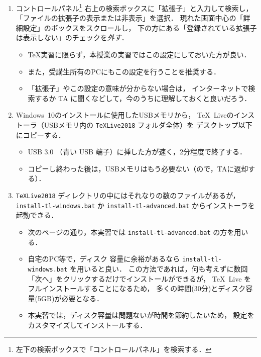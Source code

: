\documentclass{ltjsarticle}
\begin{document}
\begin{enumerate}
  \itemsep\medskipamount
  \setcounter{enumi}{-1}
\item コントロールパネル\footnote{左下の検索ボックスで「コントロールパネル」を検索する．}
  右上の検索ボックスに「拡張子」と入力して検索し，
  「ファイルの拡張子の表示または非表示」を選択．
  現れた画面中心の「詳細設定」のボックスをスクロールし，
  下の方にある「登録されている拡張子は表示しない」のチェックを\emph{外す}．
  \begin{itemize}
  \item \TeX 実習に限らず，本授業の実習ではこの設定にしておいた方が良い．
  \item また，受講生所有のPCにもこの設定を行うことを推奨する．
  \item 「拡張子」やこの設定の意味が分からない場合は，
    インターネットで検索するか TA に聞くなどして，今のうちに理解しておくと良いだろう．
  \end{itemize}
\item Windows~10のインストールに使用したUSBメモリから，
  \TeX~Liveのインストーラ（USBメモリ内の \texttt{TeXLive2018} フォルダ全体）を
  デスクトップ以下にコピーする．
  \begin{itemize}
  \item USB 3.0 （青い USB 端子）に挿した方が速く，2分程度で終了する．
  \item コピーし終わった後は，USBメモリはもう必要ない（ので，TAに返却する）．
  \end{itemize}
\item \texttt{TeXLive2018}
  ディレクトリの中にはそれなりの数のファイルがあるが，\texttt{install-tl-windows.bat}
  か \texttt{install-tl-advanced.bat} からインストーラを起動できる．
  \begin{itemize}
  \item 次のページの通り，本実習では \texttt{install-tl-advanced.bat} の方を用いる．
  \item 自宅のPC等で，ディスク
    容量に余裕があるなら \texttt{install-tl-windows.bat} を用いると良い．
    この方法であれば，何も考えずに数回「次へ」をクリックするだけでインストールができるが，
    \TeX~Live をフルインストールすることになるため，
    多くの時間(30分)とディスク容量(5GB)が必要となる．
  \item 本実習では，ディスク容量は問題ないが時間を節約したいため，
    設定をカスタマイズしてインストールする．
  \end{itemize}
\end{enumerate}

\newpage
\end{document}
